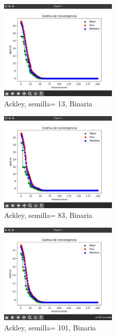 \documentclass{report}
\begin{document}
    \begin{figure}[H]
        \centering
        \includegraphics[width=0.5\textwidth]{ackley_13_bin.jpeg}
        \caption{Ackley, semilla= 13, Binaria}
    \end{figure}
    \begin{figure}[H]
        \centering
        \includegraphics[width=0.5\textwidth]{ackley_83_bin.jpeg}
        \caption{Ackley, semilla= 83, Binaria}
    \end{figure}
    \begin{figure}[H]
        \centering
        \includegraphics[width=0.5\textwidth]{ackley_101_bin.jpeg}
        \caption{Ackley, semilla= 101, Binaria}
    \end{figure}
\end{document}
